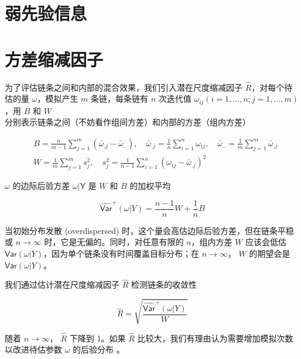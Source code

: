 \documentclass[12pt,a4paper,UTF8,twoside]{book}
\theoremstyle{definition}
\theoremstyle{definition}
\theoremstyle{definition}
\theoremstyle{remark}
\begin{document}
\section{弱先验信息}

\section{方差缩减因子}

为了评估链条之间和内部的混合效果，我们引入潜在尺度缩减因子
\(\hat{R}\)，对每个待估的量 \(\omega\)，模拟产生 \(m\) 条链，每条链有
\(n\) 次迭代值 \(\omega_{ij} (i = 1,\ldots,n;j=1,\ldots,m)\)，用 \(B\)
和 \(W\) 分别表示链条之间（不妨看作组间方差）和内部的方差（组内方差）

\begin{equation}
\begin{aligned}
& B = \frac{n}{m-1}\sum_{j=1}^{m}(\bar{\omega}_{.j} - \bar{\omega}_{..} ), \quad \bar{\omega}_{.j} = \frac{1}{n}\sum_{i=1}^{n}\omega_{ij}, \quad \bar{\omega}_{..} = \frac{1}{m}\sum_{j=1}^{m} \bar{\omega}_{.j}\\
& W = \frac{1}{m}\sum_{j=1}^{m}s^{2}_{j}, \quad s^{2}_{j} = \frac{1}{n-1}\sum_{i=1}^{n}(\omega_{ij} - \bar{\omega}_{.j})^2
\end{aligned} \label{eq:potential-scale-reduction}
\end{equation}

\(\omega\) 的边际后验方差 \(\mathsf{\omega|Y}\) 是 \(W\) 和 \(B\)
的加权平均

\begin{equation}
\widehat{\mathsf{Var}}^{+}(\omega|Y) = \frac{n-1}{n} W + \frac{1}{n} B 
\end{equation}

当初始分布发散 (overdispersed)
时，这个量会高估边际后验方差，但在链条平稳或 \(n \to \infty\)
时，它是无偏的。同时，对任意有限的 \(n\)，组内方差 \(W\) 应该会低估
\(\mathsf{Var}(\omega|Y)\)，因为单个链条没有时间覆盖目标分布；在
\(n \to \infty\)， \(W\) 的期望会是 \(\mathsf{Var}(\omega|Y)\)。

我们通过估计潜在尺度缩减因子 \(\hat{R}\) 检测链条的收敛性

\begin{equation}
\hat{R} = \sqrt{\frac{\widehat{\mathsf{Var}}^{+}(\omega|Y)}{W}}
\end{equation}

随着 \(n \to \infty\)， \(\hat{R}\) 下降到 1。如果 \(\hat{R}\)
比较大，我们有理由认为需要增加模拟次数以改进待估参数 \(\omega\)
的后验分布 \citep{Gelman2013R}。
\end{document}
